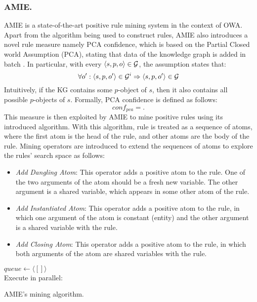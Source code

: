 \subsubsection{AMIE.}
AMIE \cite{amie} is a state-of-the-art positive rule mining system in the context of OWA. Apart from the algorithm being used to construct rules, AMIE also introduces a novel rule measure namely PCA confidence, which is based on the Partial Closed world Assumption (PCA), stating that data of the knowledge graph is added in batch \cite{amie}. In particular, with every $\langle s,p,o\rangle \in \mathcal{G}$, the assumption states that:
\[\forall o' : \langle s,p,o'\rangle \in \mathcal{G}^i \Rightarrow \langle s,p,o'\rangle \in \mathcal{G}\]
Intuitively, if the KG contains some $p$-object of $s$, then it also contains all possible $p$-objects of $s$. Formally, PCA confidence is defined as follows:
\[conf_{pca}=.\]
This measure is then exploited by AMIE to mine positive rules using its introduced algorithm. With this algorithm, rule is treated as a sequence of atoms, where the first atom is the head of the rule, and other atoms are the body of the rule. Mining operators are introduced to extend the sequences of atoms to explore the rules' search space as follows:
\begin{itemize}
\item \textit{Add Dangling Atom}: This operator adds a positive atom to the rule. One of the two arguments of the atom should be a fresh new variable. The other argument is a shared variable, which appears in some other atom of the rule.
\item \textit{Add Instantiated Atom}: This operator adds a positive atom to the rule, in which one argument of the atom is constant (entity) and the other argument is a shared variable with the rule.
\item \textit{Add Closing Atom}: This operator adds a positive atom to the rule, in which both arguments of the atom are shared variables with the rule.
\end{itemize}
\begin{algorithm}[t]
\DontPrintSemicolon
$queue\leftarrow \langle[]\rangle$\\
Execute in parallel:\\
\caption{AMIE's mining algorithm.}
\label{algor:amie}
\end{algorithm}
